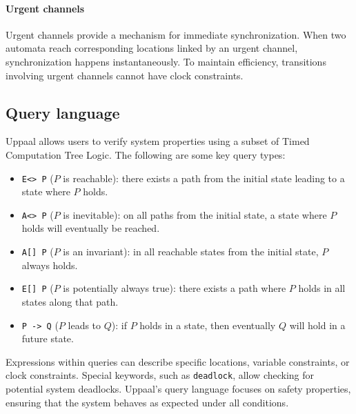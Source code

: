 \paragraph*{Urgent channels}
Urgent channels provide a mechanism for immediate synchronization. 
When two automata reach corresponding locations linked by an urgent channel, synchronization happens instantaneously. 
To maintain efficiency, transitions involving urgent channels cannot have clock constraints.

\subsection{Query language}
Uppaal allows users to verify system properties using a subset of Timed Computation Tree Logic. 
The following are some key query types:
\begin{itemize}
\item \texttt{E<> P} ($P$ is reachable): there exists a path from the initial state leading to a state where $P$ holds.
\item \texttt{A<> P} ($P$ is inevitable): on all paths from the initial state, a state where $P$ holds will eventually be reached.
\item \texttt{A[] P} ($P$ is an invariant): in all reachable states from the initial state, $P$ always holds.
\item \texttt{E[] P} ($P$ is potentially always true): there exists a path where $P$ holds in all states along that path.
\item \texttt{P -> Q} ($P$ leads to $Q$): if $P$ holds in a state, then eventually $Q$ will hold in a future state. 
\end{itemize}
\noindent Expressions within queries can describe specific locations, variable constraints, or clock constraints. 
Special keywords, such as \texttt{deadlock}, allow checking for potential system deadlocks.
Uppaal's query language focuses on safety properties, ensuring that the system behaves as expected under all conditions.